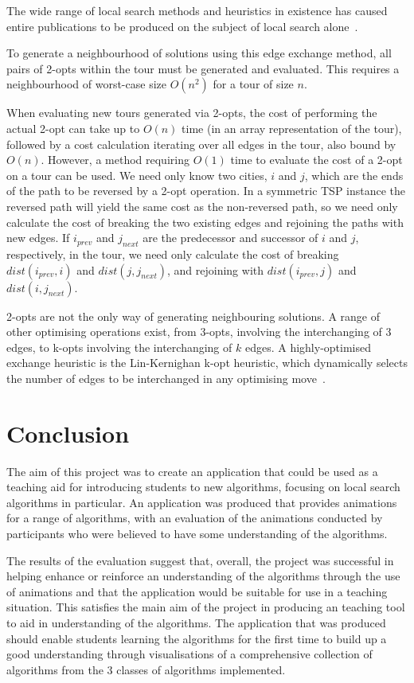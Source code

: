 \documentclass{l4proj}
\begin{document}
The wide range of local search methods and heuristics in existence has caused entire publications to be produced on the subject of local search alone~\cite{stochastic}.

To generate a neighbourhood of solutions using this edge exchange method, all pairs of 2-opts within the tour must be generated and evaluated. This requires a neighbourhood of worst-case size $O(n^2)$ for a tour of size $n$.

When evaluating new tours generated via 2-opts, the cost of performing the actual 2-opt can take up to $O(n)$ time (in an array representation of the tour), followed by a cost calculation iterating over all edges in the tour, also bound by $O(n)$. However, a method requiring $O(1)$ time to evaluate the cost of a 2-opt on a tour can be used. We need only know two cities, $i$ and $j$, which are the ends of the path to be reversed by a 2-opt operation. In a symmetric TSP instance the reversed path will yield the same cost as the non-reversed path, so we need only calculate the cost of breaking the two existing edges and rejoining the paths with new edges. If $i_{prev}$ and $j_{next}$ are the predecessor and successor of $i$ and $j$, respectively, in the tour, we need only calculate the cost of breaking $dist(i_{prev},i)$ and $dist(j,j_{next})$, and rejoining with $dist(i_{prev},j)$ and $dist(i,j_{next})$. 

2-opts are not the only way of generating neighbouring solutions. A range of other optimising operations exist, from 3-opts, involving the interchanging of 3 edges, to k-opts involving the interchanging of $k$ edges. A highly-optimised exchange heuristic is the Lin-Kernighan k-opt heuristic, which dynamically selects the number of edges to be interchanged in any optimising move~\cite{lkOpt}.

\chapter{Conclusion}
\label{conclusion}
The aim of this project was to create an application that could be used as a teaching aid for introducing students to new algorithms, focusing on local search algorithms in particular. An application was produced that provides animations for a range of algorithms, with an evaluation of the animations conducted by participants who were believed to have some understanding of the algorithms.

The results of the evaluation suggest that, overall, the project was successful in helping enhance or reinforce an understanding of the algorithms through the use of animations and that the application would be suitable for use in a teaching situation. This satisfies the main aim of the project in producing an teaching tool to aid in understanding of the algorithms. The application that was produced should enable students learning the algorithms for the first time to build up a good understanding through visualisations of a comprehensive collection of algorithms from the 3 classes of algorithms implemented.



\end{document}
